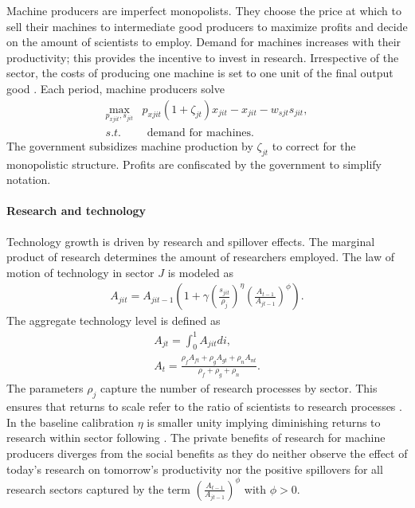 Machine producers are imperfect monopolists. They choose the price at which to sell their machines to intermediate good producers to maximize profits and decide on the amount of scientists to employ. Demand for machines increases with their productivity; this provides the incentive to invest in research. Irrespective of the sector, the costs of producing one machine is set to one unit of the final output good \citep[similar to][]{Fried2018ClimateAnalysis, Acemoglu2012TheChange}.
Each period, machine producers solve
\begin{align}
\underset{p_{xjit}, s_{jit}}{\max}&p_{xjit}(1+\zeta_{jt})x_{jit}-x_{jit}-w_{sjt}s_{jit},\\
s.t.&\ \ \text{demand for machines}.
\end{align}
The government subsidizes machine production by $\zeta_{jt}$ to correct for the monopolistic structure. Profits are confiscated by the government to simplify notation.

\paragraph{Research and technology}
Technology growth is driven by research and spillover effects. The marginal product of research determines the amount of researchers employed.
The law of motion of technology in sector $J$ is modeled as
\begin{align}
A_{jit}=A_{jit-1}\left(1+\gamma\left(\frac{s_{jit}}{\rho_j}\right)^\eta\left(\frac{A_{t-1}}{A_{jt-1}}\right)^\phi\right).
\end{align}
The aggregate technology level is defined as
\begin{align}
A_{jt}=\int_{0}^{1}A_{jit}di,\\
A_{t}=\frac{\rho_fA_{ft}+\rho_gA_{gt}+\rho_n A_{nt}}{\rho_f+\rho_g+\rho_n}.
\end{align}
The parameters $\rho_j$ capture the number of research processes by sector. This ensures that returns to scale refer to the ratio of scientists to research processes \citep{Fried2018ClimateAnalysis}. In the baseline calibration $\eta$ is smaller unity implying diminishing returns to research within sector following \cite{Fried2018ClimateAnalysis}. 
The private benefits of research for machine producers diverges from the social benefits as they do neither observe the effect of today's research on tomorrow's productivity nor the positive spillovers for all research sectors captured by the term $\left(\frac{A_{t-1}}{A_{jt-1}}\right)^\phi$ with $\phi>0$. 

